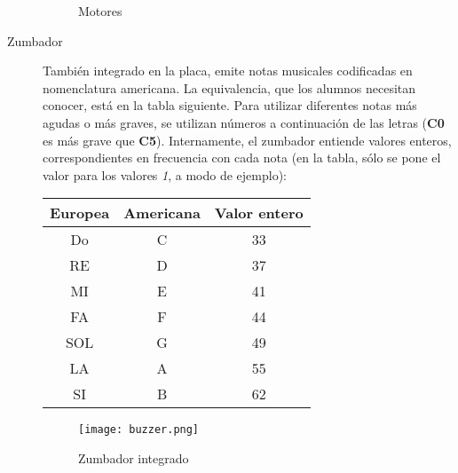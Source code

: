 \begin{description}
		\begin{figure}[H]
			\begin{center}
				\begin{subfigure}
					[Puerto de conexión de los motores]{
						\texttt{[image: puertomotor.png]}
						\label{img:puertomotor}}
				\end{subfigure}
				\begin{subfigure}
					[Motor DC]{			
						\texttt{[image: motorDC2.png]}
						\label{img:motor1}}
				\end{subfigure}
				\begin{subfigure}
					[Motor DC: montaje con rueda]{			
						\texttt{[image: motorDC.png]}
						\label{img:motor2}}
				\end{subfigure}
				\label{img:motores}
				\caption{Motores}
			\end{center}
		\end{figure}
	
	\item [Zumbador] También integrado en la placa, emite notas musicales codificadas en nomenclatura americana. La equivalencia, que los alumnos necesitan conocer, está en la tabla siguiente. Para utilizar diferentes notas más agudas o más graves, se utilizan números a continuación de las letras (\textbf{C0} es más grave que \textbf{C5}). Internamente, el zumbador entiende valores enteros, correspondientes en frecuencia con cada nota (en la tabla, sólo se pone el valor para los valores \textit{1}, a modo de ejemplo):
	\begin{center}
		\begin{tabular}{ c | c | c}	
			Europea & Americana & Valor entero \\
			\hline			
			Do & C & 33\\
			RE & D & 37\\
			MI & E & 41\\
			FA & F & 44\\
			SOL & G & 49\\
			LA & A & 55\\
			SI & B & 62\\
		\end{tabular}
	\end{center}

	
	\begin{figure}[H]
		\texttt{[image: buzzer.png]}
		\centering
		\label{img:zumbador}
		\caption{Zumbador integrado}
	\end{figure}
\end{description}



